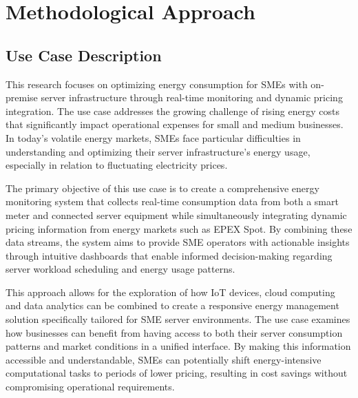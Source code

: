 

\section{Methodological Approach}

\subsection{Use Case Description}
This research focuses on optimizing energy consumption for SMEs with on-premise server infrastructure
through real-time monitoring and dynamic pricing integration. The use case addresses the growing
challenge of rising energy costs that significantly impact operational expenses for small and medium
businesses. In today's volatile energy markets, SMEs face particular difficulties in understanding
and optimizing their server infrastructure's energy usage, especially in relation to fluctuating
electricity prices.

The primary objective of this use case is to create a comprehensive energy monitoring system that
collects real-time consumption data from both a smart meter and connected server equipment while
simultaneously integrating dynamic pricing information from energy markets such as EPEX Spot.
By combining these data streams, the system aims to provide SME operators with actionable insights
through intuitive dashboards that enable informed decision-making regarding server workload
scheduling and energy usage patterns.

This approach allows for the exploration of how IoT devices, cloud computing and data analytics can
be combined to create a responsive energy management solution specifically tailored for SME server
environments. The use case examines how businesses can benefit from having access to both their
server consumption patterns and market conditions in a unified interface. By making this
information accessible and understandable, SMEs can potentially shift energy-intensive computational
tasks to periods of lower pricing, resulting in cost savings without compromising operational
requirements. \cite{tropgen2024years}

